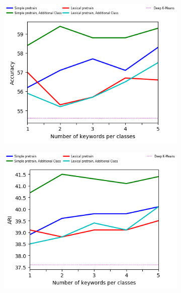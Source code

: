 \begin{figure}[!h]
  \begin{subfigure}[b]{\textwidth}
    \centering
    \includegraphics[scale=0.82]{parts/res/dat_file/acc/20NEWS_ACC.png}     
  \end{subfigure}
  \begin{subfigure}[b]{\textwidth}
    \centering
    \includegraphics[scale=0.82]{parts/res/dat_file/ari/20NEWS_ARI.png}     
  \end{subfigure}
  \begin{subfigure}[b]{\textwidth}
    \centering

\end{subfigure}
\end{figure}
